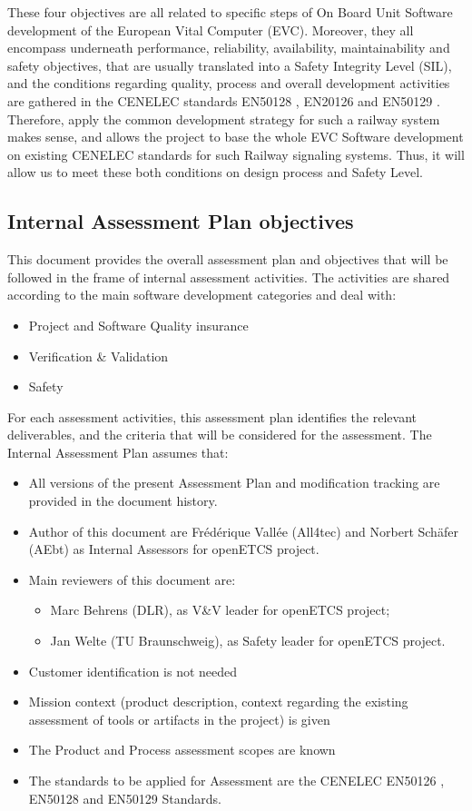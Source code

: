 \documentclass[openetcs]{template/openetcs_article}
\begin{document}
These four objectives are all related to specific steps of On Board Unit Software development of the European Vital Computer (EVC). Moreover, they all encompass
underneath performance, reliability, availability, maintainability and safety objectives, that are usually translated into a Safety Integrity Level (SIL), and
the conditions regarding quality, process and overall development activities are gathered in the CENELEC standards EN50128 \cite{EN50128}, EN20126
\cite{EN50216} and EN50129 \cite{EN50129}.
Therefore, apply the common development strategy for such a railway system makes sense, and allows the project to base the whole EVC Software development on
existing CENELEC standards for such Railway signaling systems. Thus, it will allow us to meet these both conditions on design process and Safety Level.

\subsection{Internal Assessment Plan objectives}
This document provides the overall assessment plan and objectives that will be followed in the frame of internal assessment activities.
The activities are shared according to the main software development categories and deal with:
\begin{itemize}
\item Project and Software Quality insurance
\item Verification \& Validation
\item Safety
\end{itemize}

For each assessment activities, this assessment plan identifies the relevant deliverables, and the criteria that will be considered for the assessment.
The Internal Assessment Plan assumes that: 
\begin{itemize}
\item All versions of the present Assessment Plan and modification tracking are provided in the document history.
\item Author of this document are Fr\'ed\'erique Vall\'ee (All4tec) and Norbert Sch\"afer (AEbt) as Internal Assessors for openETCS project.
\item Main reviewers of this document are:
	\begin{itemize}
	\item Marc Behrens (DLR), as V\&V leader for openETCS project;
	\item Jan Welte (TU Braunschweig), as Safety leader for openETCS project.
	\end{itemize}
\item Customer identification is not needed
\item Mission context (product description, context regarding the existing assessment of tools or artifacts in the project) is given
\item The Product and Process assessment scopes are known
\item The standards to be applied for Assessment are the CENELEC EN50126 \cite{EN50126} , EN50128 \cite{EN50128} and EN50129 \cite{EN50129} Standards.
\end{itemize}
\end{document}
